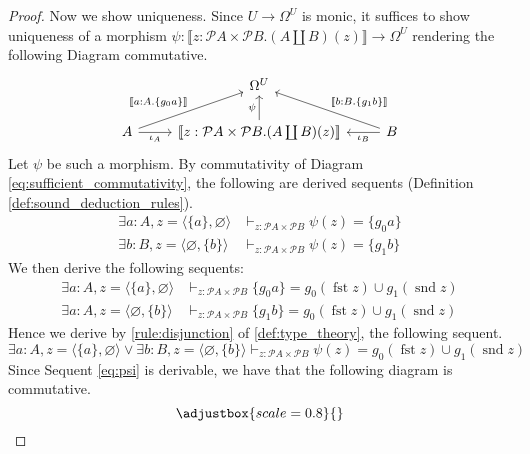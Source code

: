 \documentclass{birkjour}
\theoremstyle{plain}
\theoremstyle{definition}
\newcommand{\call}[1]{\mathcal{#1}}
\newcommand{\lto}{\longrightarrow}
\begin{document}
\begin{proof}
		Now we show uniqueness. Since $U \lto \Omega^U$ is monic, it suffices to show uniqueness of a morphism $\psi: \llbracket z: \call{P}A \times \call{P}B.(A \coprod B)(z) \rrbracket \lto \Omega^U$ rendering the following Diagram commutative.
		\begin{equation}\label{eq:sufficient_commutativity}
			\begin{tikzcd}
				& \Omega^U\\
				A\arrow[ur,"{\llbracket a:A. \lbrace g_0a \rbrace\rrbracket}"]\arrow[r,swap,"{\iota_A}"] & \llbracket z : \call{P}A \times \call{P}B . (A \coprod B)(z)\rrbracket\arrow[u,"{\psi}"] & B\arrow[ul,swap,"{\llbracket b:B. \lbrace g_1b \rbrace\rrbracket}"]\arrow[l,"{\iota_B}"]
			\end{tikzcd}
		\end{equation}
		Let $\psi$ be such a morphism. By commutativity of Diagram \eqref{eq:sufficient_commutativity}, the following are derived sequents (Definition \ref{def:sound_deduction_rules}).
		\begin{align*}
			\exists a:A, z = \langle \lbrace a \rbrace, \varnothing \rangle &\vdash_{z:\call{P}A \times \call{P}B}\psi(z) = \lbrace g_0 a \rbrace\\
			\exists b:B, z = \langle \varnothing, \lbrace b \rbrace \rangle &\vdash_{z: \call{P}A \times \call{P}B} \psi(z) = \lbrace g_1 b \rbrace
		\end{align*}
		We then derive the following sequents:
		\begin{align*}
			\exists a:A, z = \langle \lbrace a \rbrace, \varnothing \rangle &\vdash_{z: \call{P}A \times \call{P}B}\lbrace g_0a\rbrace = g_0(\operatorname{fst}z)\cup g_1(\operatorname{snd}z)\\
			\exists a:A, z = \langle \varnothing, \lbrace b \rbrace \rangle &
			\vdash_{z: \call{P}A \times \call{P}B}\lbrace g_1b\rbrace = g_0(\operatorname{fst}z)\cup g_1(\operatorname{snd}z)
		\end{align*}
		Hence we derive by \eqref{rule:disjunction} of \ref{def:type_theory}, the following sequent.
		\begin{equation}\label{eq:psi}
			\exists a:A, z = \langle \lbrace a \rbrace, \varnothing \rangle \vee \exists b:B, z = \langle \varnothing, \lbrace b \rbrace \rangle \vdash_{z: \call{P}A \times \call{P}B}\psi(z) = g_0(\operatorname{fst}z) \cup g_1(\operatorname{snd}z)
		\end{equation}
		Since Sequent \eqref{eq:psi} is derivable, we have that the following diagram is commutative.
		\begin{equation}\adjustbox{scale=0.8}{
}
\end{equation}
\end{proof}
\end{document}
